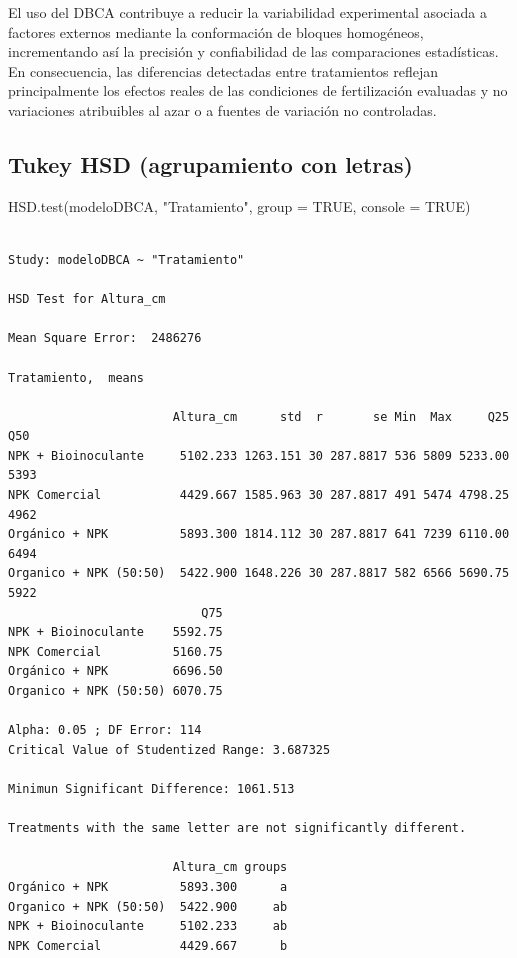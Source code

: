 \documentclass[
  spanish,
  letterpaper,
  DIV=11,
  numbers=noendperiod]{scrreprt}
\newenvironment{Shaded}{\begin{snugshade}}{\end{snugshade}}
\newcommand{\AttributeTok}[1]{\textcolor[rgb]{0.40,0.45,0.13}{#1}}
\newcommand{\ConstantTok}[1]{\textcolor[rgb]{0.56,0.35,0.01}{#1}}
\newcommand{\FunctionTok}[1]{\textcolor[rgb]{0.28,0.35,0.67}{#1}}
\newcommand{\NormalTok}[1]{\textcolor[rgb]{0.00,0.23,0.31}{#1}}
\newcommand{\StringTok}[1]{\textcolor[rgb]{0.13,0.47,0.30}{#1}}
\begin{document}
El uso del DBCA contribuye a reducir la variabilidad experimental
asociada a factores externos mediante la conformación de bloques
homogéneos, incrementando así la precisión y confiabilidad de las
comparaciones estadísticas. En consecuencia, las diferencias detectadas
entre tratamientos reflejan principalmente los efectos reales de las
condiciones de fertilización evaluadas y no variaciones atribuibles al
azar o a fuentes de variación no controladas.

\subsection{Tukey HSD (agrupamiento con
letras)}\label{tukey-hsd-agrupamiento-con-letras}

\begin{Shaded}
\begin{Highlighting}[]
\FunctionTok{HSD.test}\NormalTok{(modeloDBCA, }\StringTok{"Tratamiento"}\NormalTok{, }\AttributeTok{group =} \ConstantTok{TRUE}\NormalTok{, }\AttributeTok{console =} \ConstantTok{TRUE}\NormalTok{)}
\end{Highlighting}
\end{Shaded}

\begin{verbatim}

Study: modeloDBCA ~ "Tratamiento"

HSD Test for Altura_cm 

Mean Square Error:  2486276 

Tratamiento,  means

                       Altura_cm      std  r       se Min  Max     Q25  Q50
NPK + Bioinoculante     5102.233 1263.151 30 287.8817 536 5809 5233.00 5393
NPK Comercial           4429.667 1585.963 30 287.8817 491 5474 4798.25 4962
Orgánico + NPK          5893.300 1814.112 30 287.8817 641 7239 6110.00 6494
Organico + NPK (50:50)  5422.900 1648.226 30 287.8817 582 6566 5690.75 5922
                           Q75
NPK + Bioinoculante    5592.75
NPK Comercial          5160.75
Orgánico + NPK         6696.50
Organico + NPK (50:50) 6070.75

Alpha: 0.05 ; DF Error: 114 
Critical Value of Studentized Range: 3.687325 

Minimun Significant Difference: 1061.513 

Treatments with the same letter are not significantly different.

                       Altura_cm groups
Orgánico + NPK          5893.300      a
Organico + NPK (50:50)  5422.900     ab
NPK + Bioinoculante     5102.233     ab
NPK Comercial           4429.667      b
\end{verbatim}
\end{document}
